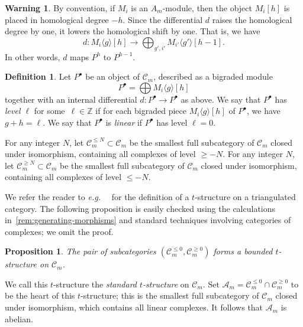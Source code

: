 \documentclass{amsart}
\newtheorem{proposition}[theorem]{Proposition}
\theoremstyle{definition}
\newtheorem{definition}[theorem]{Definition}
\newtheorem{warning}[theorem]{Warning}
\newcommand{\eg}{\textit{e.g.}~} %
\newcommand{\darkblue}{\color{darkblue}} %
\newcommand{\defn}[1]{\textsl{\darkblue #1}} %
\begin{document}
\begin{warning}
  By convention, if \(M_i\) is an \(A_m\)-module, then the object \(M_i[h]\) is placed in homological degree \(-h\).
  Since the differential \(d\) raises the homological degree by one, it lowers the homological shift by one.
  That is, we have
  \[d \colon M_i\langle g \rangle[h] \to \bigoplus_{g',i'} M_{i'}\langle g' \rangle[h-1].\]
  In other words, \(d\) maps \(P^h\) to \(P^{h-1}\).
\end{warning}
\begin{definition}\label{def:linear-complex}
  Let \(P^{\bullet}\) be an object of \(\mathcal{C}_m\), described as a bigraded module
  \[P^{\bullet} = \bigoplus M_i\langle g \rangle[h]\]
  together with an internal differential \(d \colon P^{\bullet} \to P^{\bullet}\) as above.
  We say that \(P^{\bullet}\) has \defn{level \(\ell\)} for some~\(\ell \in \mathbb{Z}\) if for each bigraded piece \(M_i \langle g \rangle[h]\) of \(P^{\bullet}\), we have \(g + h = \ell\).
  We say that \(P^{\bullet}\) is \defn{linear} if \(P^{\bullet}\) has level \(\ell = 0\).

\end{definition}
For any integer \(N\), let \(\mathcal{C}_m^{\le N} \subset \mathcal{C}_m\) be the smallest full subcategory of \(\mathcal{C}_m\) closed under isomorphism, containing all complexes of level \(\geq -N\).
For any integer \(N\), let \(\mathcal{C}_m^{\geq N} \subset \mathcal{C}_m\) be the smallest full subcategory of \(\mathcal{C}_m\) closed under isomorphism, containing all complexes of level \(\leq -N\).

We refer the reader to \eg~\cite[Sect.~1.3]{bel.ber.del:82} for the definition of a \(t\)-structure on a triangulated category.
The following proposition is easily checked using the calculations in~\cref{rem:generating-morphisms} and standard techniques involving categories of complexes; we omit the proof.
\begin{proposition}
  The pair of subcategories \((\mathcal{C}_m^{\leq 0}, \mathcal{C}_m^{\geq 0})\) forms a bounded \(t\)-structure on \(\mathcal{C}_m\).
\end{proposition}
We call this \(t\)-structure the \defn{standard \(t\)-structure} on \(\mathcal{C}_m\).
Set \(\mathcal{A}_m = \mathcal{C}^{\leq 0}_m \cap \mathcal{C}_m^{\geq 0}\) to be the heart of this \(t\)-structure; this is the smallest full subcategory of \(\mathcal{C}_m\) closed under isomorphism, which contains all linear complexes.
It follows that \(\mathcal{A}_m\) is abelian.
\end{document}
